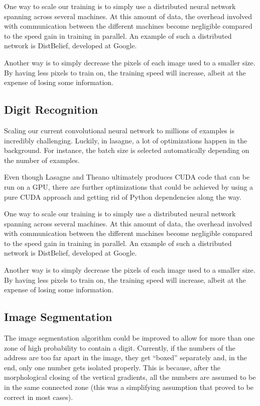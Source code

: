 \documentclass{article} %
\begin{document}
One way to scale our training is to simply use a distributed neural network spanning across several machines. At this amount of data, the overhead involved with communication between the different machines become negligible compared to the speed gain in training in parallel. An example of such a distributed network is DistBelief, developed at Google.

Another way is to simply decrease the pixels of each image used to a smaller size. By having less pixels to train on, the training speed will increase, albeit at the expense of losing some information.

\subsection{Digit Recognition}
Scaling our current convolutional neural network to millions of examples is incredibly challenging. Luckily, in lasagne, a lot of optimizations happen in the background. For instance, the batch size is selected automatically depending on the number of examples.

Even though Lasagne and Theano ultimately produces CUDA code that can be run on a GPU, there are further optimizations that could be achieved by using a pure CUDA approach and getting rid of Python dependencies along the way. 

One way to scale our training is to simply use a distributed neural network spanning across several machines. At this amount of data, the overhead involved with communication between the different machines become negligible compared to the speed gain in training in parallel. An example of such a distributed network is DistBelief, developed at Google.

Another way is to simply decrease the pixels of each image used to a smaller size. By having less pixels to train on, the training speed will increase, albeit at the expense of losing some information.

\subsection{Image Segmentation}
The image segmentation algorithm could be improved to allow for more than one zone of high probability to contain a digit. Currently, if the numbers of the address are too far apart in the image, they get “boxed” separately and, in the end, only one number gets isolated properly. This is because, after the morphological closing of the vertical gradients, all the numbers are assumed to be in the same connected zone (this was a simplifying assumption that proved to be correct in most cases).
\end{document}
